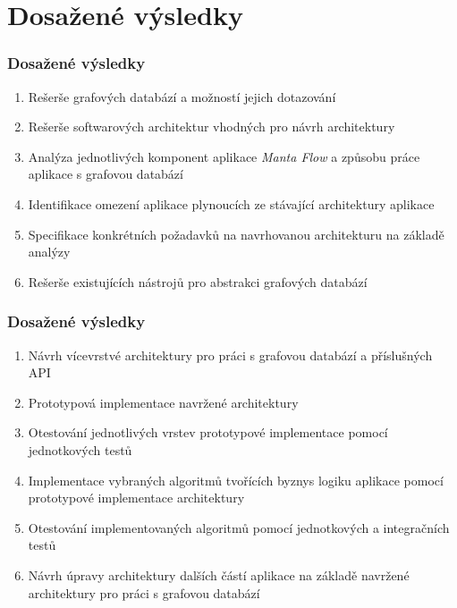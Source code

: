 \documentclass{beamer}
\newcounter{saveenumi}
\newcommand{\seti}{\setcounter{saveenumi}{\value{enumi}}}
\newcommand{\conti}{\setcounter{enumi}{\value{saveenumi}}}
\begin{document}
\section{Dosažené výsledky}
\begin{frame}
\frametitle{Dosažené výsledky}
   \begin{enumerate}
      \item Rešerše grafových databází a možností jejich dotazování
      \item Rešerše softwarových architektur vhodných pro návrh architektury
      \item Analýza jednotlivých komponent aplikace \textit{Manta Flow} a způsobu práce aplikace s grafovou databází
      \item Identifikace omezení aplikace plynoucích ze stávající architektury aplikace
      \item Specifikace konkrétních požadavků na navrhovanou architekturu na základě analýzy
      \item Rešerše existujících nástrojů pro abstrakci grafových databází
      \seti
   \end{enumerate}
\end{frame}
\begin{frame}
\frametitle{Dosažené výsledky}
   \begin{enumerate}
      \conti
      \item Návrh vícevrstvé architektury pro práci s grafovou databází a příslušných API
      \item Prototypová implementace navržené architektury
      \item Otestování jednotlivých vrstev prototypové implementace pomocí jednotkových testů
      \item Implementace vybraných algoritmů tvořících byznys logiku aplikace pomocí prototypové implementace architektury
      \item Otestování implementovaných algoritmů pomocí jednotkových a integračních testů
      \item Návrh úpravy architektury dalších částí aplikace na základě navržené architektury pro práci s grafovou databází
   \end{enumerate}
\end{frame}
\end{document}
